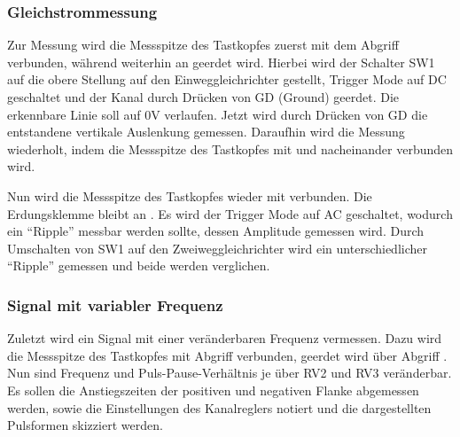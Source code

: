 \subsubsection{Gleichstrommessung}

Zur Messung wird die Messspitze des Tastkopfes zuerst mit dem Abgriff  verbunden, während weiterhin an  geerdet wird. Hierbei wird der Schalter SW1 auf die obere Stellung auf den Einweggleichrichter gestellt, Trigger Mode auf DC geschaltet und der Kanal durch Drücken von GD (Ground) geerdet. Die erkennbare Linie soll auf $0\unit{\volt}$ verlaufen. Jetzt wird durch Drücken von GD die entstandene vertikale Auslenkung gemessen. Daraufhin wird die Messung wiederholt, indem die Messspitze des Tastkopfes mit  und  nacheinander verbunden wird.

Nun wird die Messspitze des Tastkopfes wieder mit  verbunden. Die Erdungsklemme bleibt an . Es wird der Trigger Mode auf AC geschaltet, wodurch ein \enquote{Ripple} messbar werden sollte, dessen Amplitude gemessen wird. Durch Umschalten von SW1 auf den Zweiweggleichrichter wird ein unterschiedlicher \enquote{Ripple} gemessen und beide werden verglichen.

\subsubsection{Signal mit variabler Frequenz}

Zuletzt wird ein Signal mit einer veränderbaren Frequenz vermessen. Dazu wird die Messspitze des Tastkopfes mit Abgriff  verbunden, geerdet wird über Abgriff .
Nun sind Frequenz und Puls-Pause-Verhältnis je über RV2 und RV3 veränderbar. Es sollen die Anstiegszeiten der positiven und negativen Flanke abgemessen werden, sowie die Einstellungen des Kanalreglers notiert und die dargestellten Pulsformen skizziert werden.